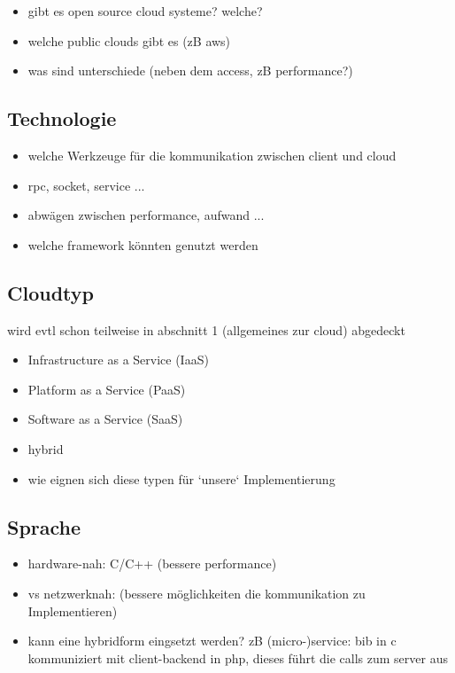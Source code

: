 \documentclass[a4paper,10pt]{article}
\begin{document}
\begin{itemize}
 \item gibt es open source cloud systeme? welche?
 \item welche public clouds gibt es (zB aws)
 \item was sind unterschiede (neben dem access, zB performance?)
\end{itemize}

\subsection{Technologie}

\begin{itemize}
 \item welche Werkzeuge für die kommunikation zwischen client und cloud
 \item rpc, socket, service ...
 \item abwägen zwischen performance, aufwand ...
 \item welche framework könnten genutzt werden
\end{itemize}


\subsection{Cloudtyp}

wird evtl schon teilweise in abschnitt 1 (allgemeines zur cloud) abgedeckt

\begin{itemize}
 \item Infrastructure as a Service (IaaS)
 \item Platform as a Service (PaaS)
 \item Software as a Service (SaaS)
 \item hybrid
 \item wie eignen sich diese typen für `unsere` Implementierung
\end{itemize}

\subsection{Sprache}

\begin{itemize}
 \item hardware-nah: C/C++ (bessere performance)
 \item vs netzwerknah: (bessere möglichkeiten die kommunikation zu Implementieren)
 \item kann eine hybridform eingsetzt werden? zB (micro-)service: bib in c kommuniziert mit client-backend in php, dieses führt die calls zum server aus
\end{itemize}
\end{document}
